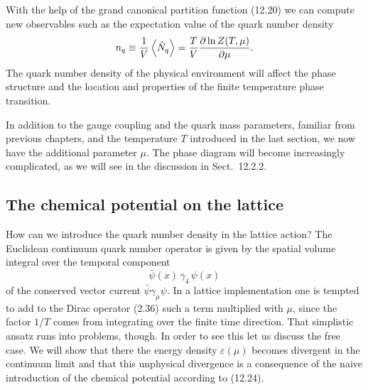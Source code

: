 With the help of the grand canonical partition function (12.20) we can compute
new observables such as the expectation value of the quark number density
\begin{equation}
  n_q \equiv \frac{1}{V}\left\langle \hat{N}_q \right\rangle
    = \frac{T}{V}\frac{\partial\ln Z(T,\mu)}{\partial\mu}.
\end{equation}
The quark number density of the physical environment will affect the phase
structure and the location and properties of the finite temperature phase
transition.

In addition to the gauge coupling and the quark mass parameters, familiar from
previous chapters, and the temperature $T$ introduced in the last section, we
now have the additional parameter $\mu$. The phase diagram will become
increasingly complicated, as we will see in the discussion in Sect.~12.2.2.

\subsection{The chemical potential on the lattice}

How can we introduce the quark number density in the lattice action? The
Euclidean continuum quark number operator is given by the spatial volume
integral over the temporal component
\begin{equation}
  \bar{\psi}(x)\,\gamma_4\,\psi(x)
\end{equation}
of the conserved vector current $\bar{\psi}\gamma_\mu\psi$. In a lattice
implementation one is tempted to add to the Dirac operator (2.36) such a term
multiplied with $\mu$, since the factor $1/T$ comes from integrating over the
finite time direction. That simplistic ansatz runs into problems, though. In
order to see this let us discuss the free case. We will show that there the
energy density $\varepsilon(\mu)$ becomes divergent in the continuum limit and
that this unphysical divergence is a consequence of the naive introduction of
the chemical potential according to (12.24).


